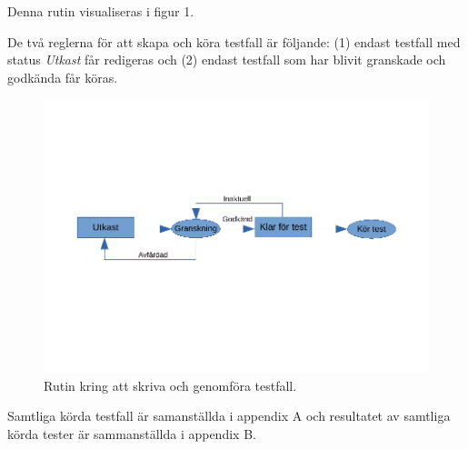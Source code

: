 \noindent
Denna rutin visualiseras i figur 1.

De två reglerna för att skapa och köra testfall är följande: (1) endast testfall med status \textit{Utkast} får redigeras och (2) endast testfall som har blivit granskade och godkända får köras.

\begin{figure}[h]
  \centering
  \includegraphics[trim={0 4cm 0 3cm}, clip, scale=0.8]{figurer/testrutin.pdf}
  \caption{Rutin kring att skriva och genomföra testfall.}
\end{figure}

\noindent
Samtliga körda testfall är samanställda i appendix A och resultatet av samtliga körda tester är sammanställda i appendix B.

